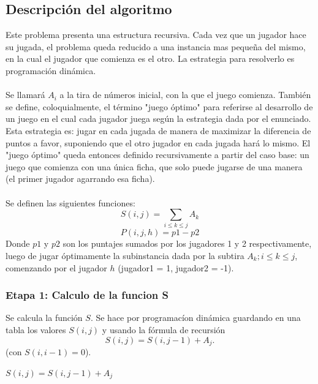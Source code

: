 \subsection{Descripci\'on del algoritmo}
Este problema presenta una estructura recursiva. Cada vez que un jugador hace su jugada, el problema queda reducido a una instancia mas peque\~na del mismo, en la cual el jugador que comienza es el otro. La estrategia para resolverlo es programaci\'on din\'amica.\\
\\
Se llamar\'a $ A_{i}$ a la tira de n\'umeros inicial, con la que el juego comienza. Tambi\'en se define, coloquialmente, el t\'ermino "juego \'optimo" para referirse al desarrollo de un juego en el cual cada jugador juega seg\'un la estrategia dada por el enunciado. Esta estrategia es: jugar en cada jugada de manera de maximizar la diferencia de puntos a favor, suponiendo que el otro jugador en cada jugada har\'a lo mismo. El "juego \'optimo" queda entonces definido recursivamente a partir del caso base: un juego que comienza con una \'unica ficha, que solo puede jugarse de una manera (el primer jugador agarrando esa ficha).\\
\\
Se definen las siguientes funciones:\\
$$S(i,j)=\sum_{i \le k \le j} A_{k}$$
$$P(i,j,h)= p1 - p2$$
Donde $p1$ y $p2$ son los puntajes sumados por los jugadores 1 y 2 respectivamente, luego de jugar \'optimamente la subinstancia dada por la subtira $A_{k} ; i \le k \le j $, comenzando por el jugador $h$ (jugador1 = 1, jugador2 = -1).
\subsubsection{Etapa 1: Calculo de la funcion S}

Se calcula la funci\'on $S$. Se hace por programac\'ion din\'amica guardando en una tabla los valores $S(i,j)$ y usando la f\'ormula de recursi\'on $$S(i,j) = S(i,j-1) + A_{j}.$$ (con $S(i,i-1)=0$).\\
\begin{algorithmic}
		\State $S(i,j) = S(i,j-1) + A_{j}$ 
	\EndFor
\EndFor
\end{algorithmic}

